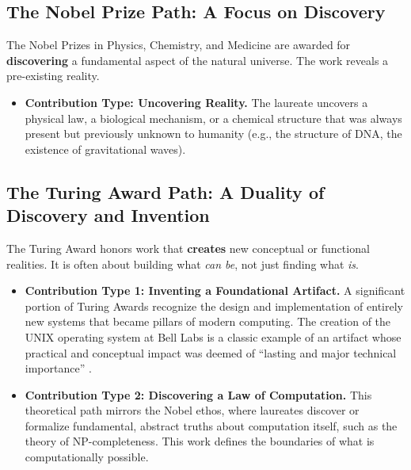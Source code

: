 \subsection{The Nobel Prize Path: A Focus on Discovery}
The Nobel Prizes in Physics, Chemistry, and Medicine are awarded for \textbf{discovering} a fundamental aspect of the natural universe.
The work reveals a pre-existing reality.
\begin{itemize}[leftmargin=*]
    \item \textbf{Contribution Type: Uncovering Reality.} The laureate uncovers a physical law, a biological mechanism, or a chemical structure that was always present but previously unknown to humanity (e.g., the structure of DNA, the existence of gravitational waves).
\end{itemize}

\subsection{The Turing Award Path: A Duality of Discovery and Invention}
The Turing Award honors work that \textbf{creates} new conceptual or functional realities.
It is often about building what \textit{can be}, not just finding what \textit{is}.
\begin{itemize}[leftmargin=*]
    \item \textbf{Contribution Type 1: Inventing a Foundational Artifact.} A significant portion of Turing Awards recognize the design and implementation of entirely new systems that became pillars of modern computing.
    The creation of the UNIX operating system at Bell Labs is a classic example of an artifact whose practical and conceptual impact was deemed of ``lasting and major technical importance'' \citep{shasha2003}.

    \item \textbf{Contribution Type 2: Discovering a Law of Computation.} This theoretical path mirrors the Nobel ethos, where laureates discover or formalize fundamental, abstract truths about computation itself, such as the theory of NP-completeness.
    This work defines the boundaries of what is computationally possible.
\end{itemize}
